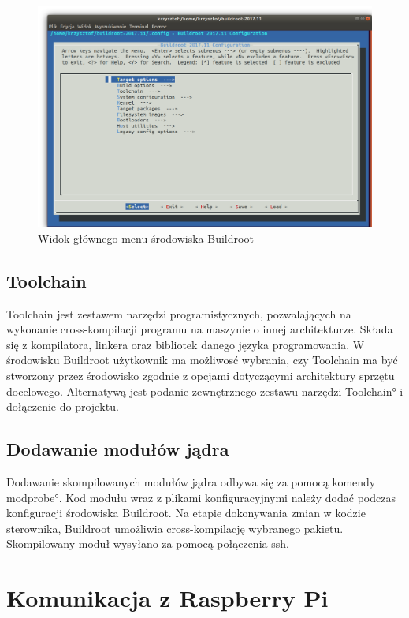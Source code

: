 \begin{figure}[h]
	\centering
		\includegraphics[width=13cm]{buildroot_menu}
	\caption{Widok głównego menu środowiska Buildroot} 
	\label{fig:brmenuconfig}
\end{figure}

\subsection{Toolchain}

Toolchain jest zestawem narzędzi programistycznych, pozwalających na wykonanie cross-kompilacji programu na maszynie o innej architekturze. Składa się z kompilatora, linkera oraz bibliotek danego języka programowania. W środowisku Buildroot użytkownik ma możliwosć wybrania, czy Toolchain ma być stworzony przez środowisko zgodnie z opcjami dotyczącymi architektury sprzętu docelowego. Alternatywą jest podanie zewnętrznego zestawu narzędzi \ang{Toolchain} i dołączenie do projektu.

\subsection{Dodawanie modułów jądra}

Dodawanie skompilowanych modułów jądra odbywa się za pomocą komendy \ang{modprobe}. Kod modułu wraz z plikami konfiguracyjnymi należy dodać podczas konfiguracji środowiska Buildroot. Na etapie dokonywania zmian w kodzie sterownika, Buildroot umożliwia cross-kompilację wybranego pakietu. Skompilowany moduł wysyłano za pomocą połączenia ssh.


\section{Komunikacja z Raspberry Pi}

